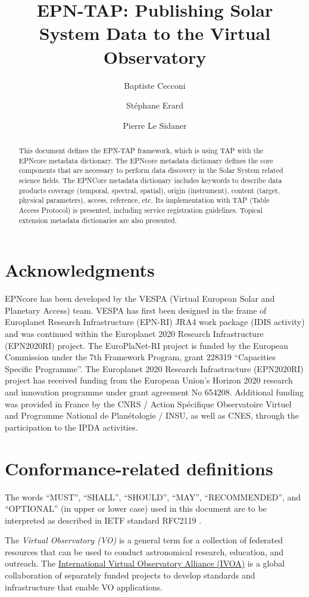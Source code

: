 \documentclass[11pt,a4paper]{ivoa}
\title{EPN-TAP: Publishing Solar System Data to the Virtual Observatory}
\author{Baptiste Cecconi}
\author{St\'ephane Erard}
\author{Pierre Le Sidaner}
\begin{document}
\begin{abstract}
This document defines the EPN-TAP framework, which is using TAP with the EPNcore metadata dictionary. The EPNcore metadata dictionary defines the core components that are necessary 
to perform data discovery in the Solar System related science fields. The EPNCore metadata dictionary includes keywords to describe data products coverage (temporal, spectral, 
spatial), origin (instrument), content (target, physical parameters), access, reference, etc. Its implementation with TAP (Table Access Protocol) is presented, including service 
registration guidelines. Topical extension metadata dictionaries are also presented.
\end{abstract}


\section*{Acknowledgments}

EPNcore has been developed by the VESPA (Virtual European Solar and Planetary Access) team. 
VESPA has first been designed in the frame of Europlanet Research Infrastructure (EPN-RI) JRA4 work package (IDIS activity) and was continued within the Europlanet 2020 Research Infrastructure (EPN2020RI) project.
The EuroPlaNet-RI project is funded by the European Commission under the 7th Framework Program, grant 228319 ``Capacities Specific Programme''.
The Europlanet 2020 Research Infrastructure (EPN2020RI) project has received funding from the European Union's Horizon 2020 research and innovation programme under grant agreement No 654208. 
Additional funding was provided in France by the CNRS / Action Sp\'ecifique Observatoire Virtuel and Programme National de Plan\'etologie / INSU, as well as CNES, through the participation to the IPDA activities.

\section*{Conformance-related definitions}

The words ``MUST'', ``SHALL'', ``SHOULD'', ``MAY'', ``RECOMMENDED'', and
``OPTIONAL'' (in upper or lower case) used in this document are to be
interpreted as described in IETF standard RFC2119 \citep{std:RFC2119}.

The \emph{Virtual Observatory (VO)} is a
general term for a collection of federated resources that can be used
to conduct astronomical research, education, and outreach.
The \href{http://www.ivoa.net}{International
Virtual Observatory Alliance (IVOA)} is a global
collaboration of separately funded projects to develop standards and
infrastructure that enable VO applications.
\end{document}

